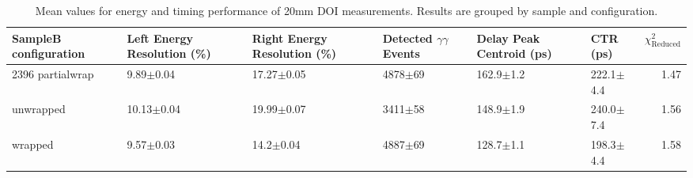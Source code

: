 \begin{table}
\caption{\label{doictrresults-20} Mean values for energy and timing performance of 20mm DOI measurements. Results are grouped by sample and configuration.}
\begin{tabular}{llllllr}
\hline
SampleB configuration & Left Energy Resolution (\%) & Right Energy Resolution (\%) & Detected $\gamma\gamma$ Events & Delay Peak Centroid (ps)  & CTR (ps) &  $\chi^2_\text{Reduced}$ \\
\hline
2396    partialwrap   &        9.89$\pm$0.04 &   17.27$\pm$0.05 &  4878$\pm$69 &  162.9$\pm$1.2 &  222.1$\pm$4.4 &        1.47 \\
        unwrapped     &       10.13$\pm$0.04 &   19.99$\pm$0.07 &  3411$\pm$58 &  148.9$\pm$1.9 &  240.0$\pm$7.4 &        1.56 \\
        wrapped       &        9.57$\pm$0.03 &    14.2$\pm$0.04 &  4887$\pm$69 &  128.7$\pm$1.1 &  198.3$\pm$4.4 &        1.58 \\
\hline
\end{tabular}
\end{table}